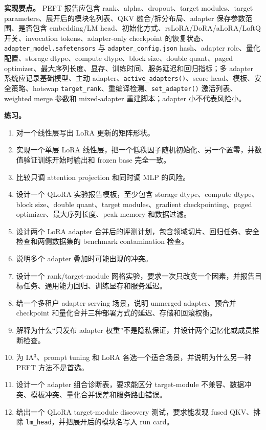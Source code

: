 \documentclass[UTF8,zihao=-4,openany]{ctexbook}
\begin{document}
\textbf{实现要点。} PEFT 报告应包含 rank、alpha、dropout、target modules、target parameters、展开后的模块名列表、QKV 融合/拆分布局、adapter 保存参数范围、是否包含 embedding/LM head、初始化方式、rsLoRA/DoRA/aLoRA/LoftQ 开关、invocation tokens、adapter-only checkpoint 的恢复状态、\texttt{adapter\_model.safetensors} 与 \texttt{adapter\_config.json} hash、adapter role、量化配置、storage dtype、compute dtype、block size、double quant、paged optimizer、最大序列长度、显存、训练时间、服务延迟和回归指标；多 adapter 系统应记录基础模型、主动 adapter、\texttt{active\_adapters()}、score head、模板、安全策略、hotswap \texttt{target\_rank}、重编译检测、\texttt{set\_adapter()} 激活列表、weighted merge 参数和 mixed-adapter 重建脚本；adapter 小不代表风险小。

\textbf{练习。}
\begin{enumerate}
\item 对一个线性层写出 LoRA 更新的矩阵形状。
\item 实现一个单层 LoRA 线性层，把一个低秩因子随机初始化、另一个置零，并数值验证训练开始时输出和 frozen base 完全一致。
\item 比较只调 attention projection 和同时调 MLP 的风险。
\item 设计一个 QLoRA 实验报告模板，至少包含 storage dtype、compute dtype、block size、double quant、target modules、gradient checkpointing、paged optimizer、最大序列长度、peak memory 和数据过滤。
\item 设计两个 LoRA adapter 合并后的评测计划，包含领域切片、回归任务、安全检查和两侧数据集的 benchmark contamination 检查。
\item 说明多个 adapter 叠加时可能出现的冲突。
\item 设计一个 rank/target-module 网格实验，要求一次只改变一个因素，并报告目标任务、通用能力回归、训练显存和服务延迟。
\item 给一个多租户 adapter serving 场景，说明 unmerged adapter、预合并 checkpoint 和量化合并三种部署方式的延迟、存储和回滚权衡。
\item 解释为什么“只发布 adapter 权重”不是隐私保证，并设计两个记忆化或成员推断检查。
\item 为 IA$^3$、prompt tuning 和 LoRA 各选一个适合场景，并说明为什么另一种 PEFT 方法不是首选。
\item 设计一个 adapter 组合诊断表，要求能区分 target-module 不兼容、数据冲突、模板冲突、量化合并误差和服务路由错误。
\item 给出一个 QLoRA target-module discovery 测试，要求能发现 fused QKV、排除 \texttt{lm\_head}，并把展开后的模块名写入 run card。

\end{enumerate}
\end{document}
